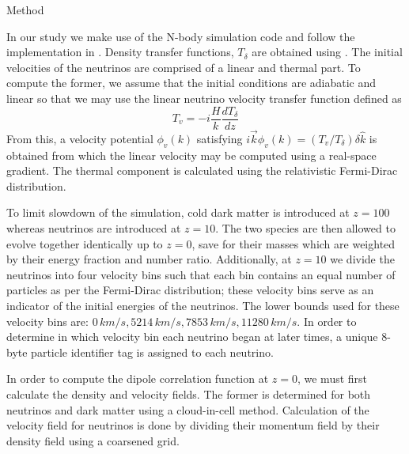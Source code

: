 \begin{section}{Method}
  \label{sec:method}

In our study we make use of the N-body simulation code 
\cpm and follow the implementation in \cite{bib:Inman}. 
Density transfer functions, $T_\delta$ are obtained 
using \camb. The initial velocities of the neutrinos are 
comprised of a linear and thermal part. To compute the former, 
we assume that the initial conditions are adiabatic and linear 
so that we may use the linear neutrino velocity transfer 
function defined as
\begin{equation}
  T_v=-i\frac{H}{k}\frac{dT_{\delta}}{dz}
\end{equation}
From this, a velocity potential $\phi_{v}(k)$ satisfying 
$i\overrightarrow{k}\phi_{v}(k)=(T_v/T_\delta)\delta\hat{k}$ 
is obtained from which the linear velocity may be computed 
using a real-space gradient. The thermal component is 
calculated using the relativistic Fermi-Dirac distribution. 

\par To limit slowdown of the simulation, cold dark matter is 
introduced at $z=100$ whereas neutrinos are introduced 
at $z=10$. The two species are then allowed to evolve together 
identically up to $z=0$, save for their masses which are weighted by their
energy fraction and number ratio. Additionally, at $z=10$ we divide the neutrinos 
into four velocity bins such that each bin contains an equal 
number of particles as per the Fermi-Dirac distribution; these 
velocity bins serve as an indicator of the initial energies of 
the neutrinos. The lower bounds used for these velocity bins 
are: $0\,km/s, 5214\,km/s, 7853\, km/s, 11280\,km/s$. In order 
to determine in which velocity bin each neutrino began at later 
times, a unique 8-byte particle identifier tag is assigned to each neutrino. 

\par In order to compute the dipole correlation function at $z=0$, we
 must first calculate the density and velocity fields. The 
former is determined for both neutrinos and dark matter 
using a cloud-in-cell method. Calculation of the 
velocity field for neutrinos is done by dividing their 
momentum field by their density field using a coarsened grid.


\end{section}
